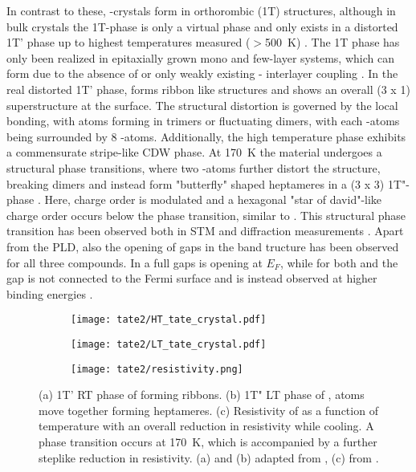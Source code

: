 In contrast to these, -crystals form in orthorombic (1T) structures, although in bulk crystals the 1T-phase is only a virtual phase and only exists in a distorted 1T' phase up to highest temperatures measured ($>$\qty{500}{\kelvin}) \cite{petkov_exotic_2020}.
The 1T phase has only been realized in epitaxially grown mono and few-layer systems, which can form due to the absence of or only weakly existing - interlayer coupling \cite{hwang_novel_2022, wang_polymorphic_2024}.
In the real distorted 1T' phase,  forms ribbon like structures and shows an overall (3 x 1) superstructure at the surface.
The structural distortion is governed by the local bonding, with  atoms forming in trimers or fluctuating dimers, with each -atoms being surrounded by 8 -atoms.
Additionally, the high temperature phase exhibits a commensurate stripe-like CDW phase.
At \qty{170}{\kelvin} the material undergoes a structural phase transitions, where two -atoms further distort the structure, breaking dimers and instead form "butterfly" shaped heptameres in a (3 x 3) 1T"-phase \cite{feng_charge_2016, katayama_observation_2023}.
Here, charge order is modulated and a hexagonal "star of david"-like charge order occurs below the phase transition, similar to .
This structural phase transition has been observed both in STM and diffraction measurements \cite{feng_charge_2016, siddiqui_ultrafast_2021, domrose_femtosecond_2024}.
Apart from the PLD, also the opening of gaps in the band tructure has been observed for all three compounds.
In  a full gaps is opening at $E_F$, while for both  and  the gap is not connected to the Fermi surface and is instead observed at higher binding energies \cite{lin_evidence_2022, mitsuishi_unveiling_2024}.

\begin{figure}
	\centering
	\begin{subfigure}[b]{0.3\textwidth}
		\texttt{[image: tate2/HT\_tate\_crystal.pdf]}
	\end{subfigure}
	\hfill
	\begin{subfigure}[b]{0.3\textwidth}
		\texttt{[image: tate2/LT\_tate\_crystal.pdf]}
	\end{subfigure}
	\hfill
	\begin{subfigure}[b]{0.3\textwidth}
		\texttt{[image: tate2/resistivity.png]}
	\end{subfigure}
	\caption{(a) 1T' RT phase of  forming ribbons. (b) 1T" LT phase of ,  atoms move together forming heptameres. (c) Resistivity of  as a function of temperature with an overall reduction in resistivity while cooling. A phase transition occurs at \qty{170}{\kelvin}, which is accompanied by a further steplike reduction in resistivity. (a) and (b) adapted from \cite{lin_evidence_2022}, (c) from \cite{hu_optical_2022}.}
	\label{fig:tate_structure}
\end{figure}

